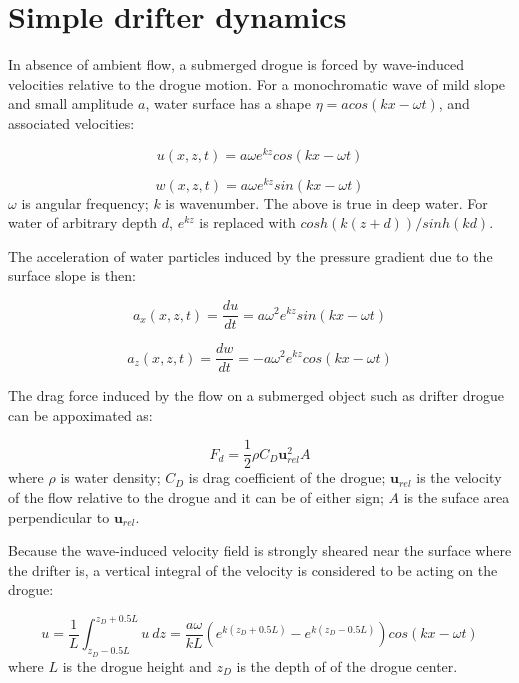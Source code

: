 \documentclass[12pt,letterpaper]{article}
\begin{document}
\doublespacing

\section{Simple drifter dynamics}

In absence of ambient flow, a submerged drogue is forced by 
wave-induced velocities relative to the drogue motion.
For a monochromatic wave of mild slope and small amplitude $a$,
water surface has a shape $\eta = acos{(kx - \omega t)}$, 
and associated velocities:

\begin{equation}
u(x,z,t) = a \omega e^{kz} cos{(kx-\omega t)}
\end{equation}

\begin{equation}
w(x,z,t) = a \omega e^{kz} sin{(kx-\omega t)}
\end{equation}
$\omega$ is angular frequency; $k$ is wavenumber.
The above is true in deep water. For water of arbitrary depth $d$,
$e^{kz}$ is replaced with $cosh(k(z+d))/sinh(kd)$.

The acceleration of water particles induced by the pressure gradient
due to the surface slope is then:

\begin{equation}
a_x(x,z,t) = \dfrac{du}{dt} = a \omega^2 e^{kz} sin{(kx-\omega t)}
\end{equation}

\begin{equation}
a_z(x,z,t) = \dfrac{dw}{dt} = -a \omega^2 e^{kz} cos{(kx-\omega t)}
\end{equation}

The drag force induced by the flow on a submerged object such as drifter drogue
can be appoximated as:

\begin{equation}
F_d = \dfrac{1}{2} \rho C_D \mathbf{u}_{rel}^2 A 
\end{equation}
where $\rho$ is water density; $C_D$ is drag coefficient of the drogue;
$\mathbf{u}_{rel}$ is the velocity of the flow relative to the drogue 
and it can be of either sign;
$A$ is the suface area perpendicular to $\mathbf{u}_{rel}$.

Because the wave-induced velocity field is strongly sheared near the surface
where the drifter is, a vertical integral of the velocity is considered to be 
acting on the drogue:

\begin{equation}
u = \dfrac{1}{L} \int_{z_D-0.5L}^{z_D+0.5L} u\ dz
= \dfrac{a \omega}{kL} \left( e^{k(z_D+0.5L)} - e^{k(z_D-0.5L)} \right)
cos{(kx-\omega t)}
\end{equation}
where $L$ is the drogue height and $z_D$ is the depth of of the drogue center.
\end{document}
